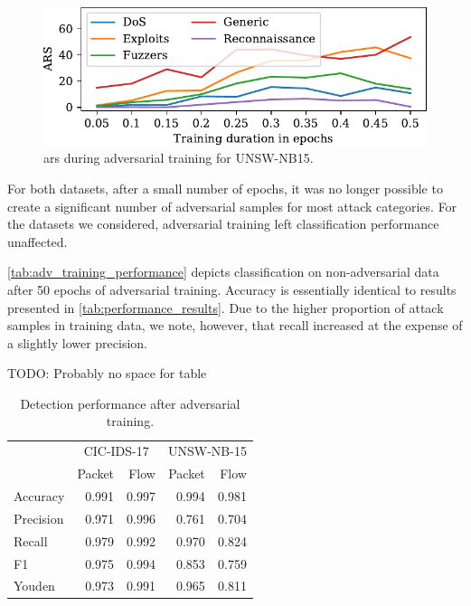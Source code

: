\documentclass[conference]{IEEEtran}
\newcommand\note[2]{{\color{#1}#2}}
\newcommand\todo[1]{{\note{red}{TODO: #1}}}
\begin{document}
\begin{figure}
\includegraphics[width=\columnwidth]{../plots/ars/ars_15.pdf}
\caption{\gls{ars} during adversarial training for UNSW-NB15.}
\label{fig:avdistance}
\end{figure}

For both datasets, after a small number of epochs, it was no longer possible to create a significant number of adversarial samples for most attack categories. For the datasets we considered, adversarial training left classification performance unaffected.

\autoref{tab:adv_training_performance} depicts classification on non-adversarial data after 50 epochs of adversarial training. Accuracy is essentially identical to results presented in \autoref{tab:performance_results}. Due to the higher proportion of attack samples in training data, we note, however, that recall increased at the expense of a slightly lower precision. 


\begin{table}
\caption{Detection performance after adversarial training.} \label{tab:adv_training_performance}
\todo{Probably no space for table}
\centering
\begin{tabular}{l r r r r} \toprule
& \multicolumn{2}{c}{CIC-IDS-17} & \multicolumn{2}{c}{UNSW-NB-15} \\
	&	Packet	&	Flow	&	Packet	&	Flow	\\	\midrule
Accuracy	&	0.991	&	0.997	&	0.994	&	0.981	\\
Precision	&	0.971	&	0.996	&	0.761	&	0.704	\\
Recall	&	0.979	&	0.992	&	0.970	&	0.824	\\
F1	&	0.975	&	0.994	&	0.853	&	0.759	\\
Youden	&	0.973	&	0.991	&	0.965	&	0.811	\\


\bottomrule
\end{tabular}
\end{table}
\end{document}
